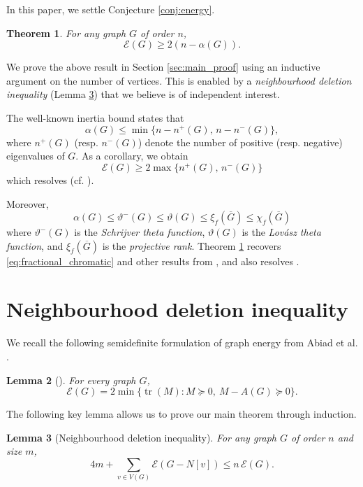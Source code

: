 \documentclass[11pt]{article}
\theoremstyle{plain}
\newtheorem{theorem}{Theorem}[section]
\newtheorem{lemma}[theorem]{Lemma}
\numberwithin{equation}{section}
\DeclareMathOperator{\tr}{tr}
\begin{document}
In this paper, we settle Conjecture \ref{conj:energy}.

\begin{theorem}\label{thm:main}
    For any graph $G$ of order $n$, 
    \[ \mathcal{E}(G)\ge 2(n-\alpha(G)).\]
\end{theorem}

We prove the above result in Section \ref{sec:main_proof} using an inductive argument on the number of vertices. This is enabled by a \emph{neighbourhood deletion inequality} (Lemma \ref{lemma:deletion}) that we believe is of independent interest.

The well-known inertia bound states that 
\[\alpha(G)\le \min\{n-n^+(G),\, n-n^-(G)\},\]
where $n^+(G)$ (resp. $n^-(G)$) denote the number of positive (resp. negative) eigenvalues of $G$. 
As a corollary, we obtain 
\[ \mathcal{E}(G)\ge 2\max\{n^+(G),\, n^-(G)\} \]
which resolves \cite[Conjectures \#20, \#21, Table 6]{Aouchiche_Hansen_2010} (cf. \cite{Liu_Ning_OpenProblems_2023}).

Moreover, 
\[\alpha(G)\le \vartheta^-(G) \le\vartheta(G) \le \xi_f(\overline{G}) \le \chi_f(\overline{G})\] 
where $\vartheta^-(G)$ is the \emph{Schrijver theta function}, $\vartheta(G)$ is the \emph{Lov\'{a}sz theta function}, and $\xi_f(\overline{G})$ is the \emph{projective rank}. Theorem \ref{thm:main} recovers \eqref{eq:fractional_chromatic} and other results from \cite{Abiad_2025_SDPlenses}, and also resolves \cite[Conjecture 6.1]{Abiad_2025_SDPlenses}.

\section{Neighbourhood deletion inequality}
We recall the following semidefinite formulation of graph energy from Abiad et al. \cite{Abiad_2025_SDPlenses}.

\begin{lemma}[\cite{Abiad_2025_SDPlenses}]\label{lemma:SDP_formulation}
For every graph $G$,
\begin{equation}\label{eq:graph-sdp}
    \mathcal{E}(G)
    =2\min\bigl\{\tr(M): M\succeq 0, \ M-A(G)\succeq 0 \bigr\}.
\end{equation}
\end{lemma}

The following key lemma allows us to prove our main theorem through induction. 

\begin{lemma}[Neighbourhood deletion inequality]\label{lemma:deletion} For any graph $G$ of order $n$ and size $m$, 
\begin{equation}\label{eq:deletion_inequality}
     4m + \sum_{v\in V(G)}\mathcal{E}(G-N[v])\le n\,\mathcal{E}(G).
\end{equation}
\end{lemma}
\end{document}

